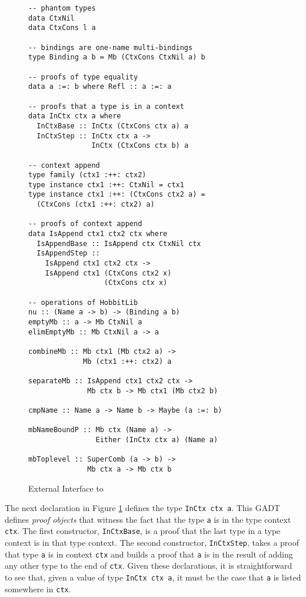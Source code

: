 \documentclass[natbib]{sigplanconf}
\begin{document}
\begin{figure}[t]
\vspace{-5pt}
\begin{lstlisting}
-- phantom types
data CtxNil
data CtxCons l a

-- bindings are one-name multi-bindings
type Binding a b = Mb (CtxCons CtxNil a) b

-- proofs of type equality
data a :=: b where Refl :: a :=: a

-- proofs that a type is in a context
data InCtx ctx a where
  InCtxBase :: InCtx (CtxCons ctx a) a
  InCtxStep :: InCtx ctx a ->
               InCtx (CtxCons ctx b) a

-- context append
type family (ctx1 :++: ctx2)
type instance ctx1 :++: CtxNil = ctx1
type instance ctx1 :++: (CtxCons ctx2 a) =
  (CtxCons (ctx1 :++: ctx2) a)

-- proofs of context append
data IsAppend ctx1 ctx2 ctx where
  IsAppendBase :: IsAppend ctx CtxNil ctx
  IsAppendStep ::
    IsAppend ctx1 ctx2 ctx ->
    IsAppend ctx1 (CtxCons ctx2 x)
                  (CtxCons ctx x)

-- operations of HobbitLib
nu :: (Name a -> b) -> (Binding a b)
emptyMb :: a -> Mb CtxNil a
elimEmptyMb :: Mb CtxNil a -> a

combineMb :: Mb ctx1 (Mb ctx2 a) ->
             Mb (ctx1 :++: ctx2) a

separateMb :: IsAppend ctx1 ctx2 ctx ->
              Mb ctx b -> Mb ctx1 (Mb ctx2 b)

cmpName :: Name a -> Name b -> Maybe (a :=: b)

mbNameBoundP :: Mb ctx (Name a) ->
                Either (InCtx ctx a) (Name a)

mbToplevel :: SuperComb (a -> b) ->
              Mb ctx a -> Mb ctx b
\end{lstlisting}
\caption{External Interface to \ourlib}
\label{fig:hobbit-ops}
\end{figure}


The next declaration in Figure \ref{fig:hobbit-ops} defines the type
\lstinline{InCtx ctx a}.  This GADT defines \emph{proof objects} that
witness the fact that the type \lstinline{a} is in the type context
\lstinline{ctx}. The first constructor, \lstinline{InCtxBase}, is a
proof that the last type in a type context is in that type
context. The second constructor, \lstinline{InCtxStep}, takes a proof
that type \lstinline{a} is in context \lstinline{ctx} and builds a
proof that \lstinline{a} is in the result of adding any other type to
the end of \lstinline{ctx}.  Given these declarations, it is
straightforward to see that, given a value of type
\lstinline{InCtx ctx a}, it must be the case that \lstinline{a} is
listed somewhere in \lstinline{ctx}.
\end{document}
